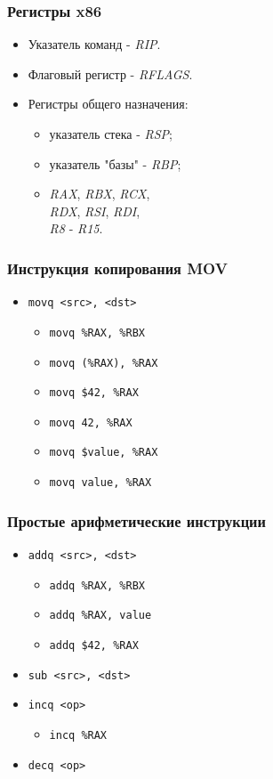 \begin{frame}
\frametitle{Регистры x86}
\begin{itemize}
    \item<1-> Указатель команд - \emph{RIP}.
    \item<2-> Флаговый регистр - \emph{RFLAGS}.
    \item<3-> Регистры общего назначения:
    \begin{itemize}
        \item указатель стека - \emph{RSP};
        \item указатель "базы" - \emph{RBP};
        \item \emph{RAX}, \emph{RBX}, \emph{RCX}, \\
              \emph{RDX}, \emph{RSI}, \emph{RDI}, \\
              \emph{R8} - \emph{R15}.
    \end{itemize}
\end{itemize}
\end{frame}

\begin{frame}[fragile]
\frametitle{Инструкция копирования MOV}
\begin{itemize}
    \item<1->\lstinline|movq <src>, <dst>|
    \begin{itemize}
        \item<2->\lstinline|movq %RAX, %RBX|
        \item<3->\lstinline|movq (%RAX), %RAX|
        \item<4->\lstinline|movq $42, %RAX|
        \item<5->\lstinline|movq 42, %RAX|
        \item<6->\lstinline|movq $value, %RAX|
        \item<7->\lstinline|movq value, %RAX|
    \end{itemize}
\end{itemize}
\end{frame}

\begin{frame}[fragile]
\frametitle{Простые арифметические инструкции}
\begin{itemize}
    \item<1->\lstinline|addq <src>, <dst>|
    \begin{itemize}
        \item\lstinline|addq %RAX, %RBX|
        \item\lstinline|addq %RAX, value|
        \item\lstinline|addq $42, %RAX|
    \end{itemize}
    \item<1->\lstinline|sub <src>, <dst>|
    \item<2->\lstinline|incq <op>|
    \begin{itemize}
        \item\lstinline|incq %RAX|
    \end{itemize}
    \item<2->\lstinline|decq <op>|
\end{itemize}
\end{frame}

